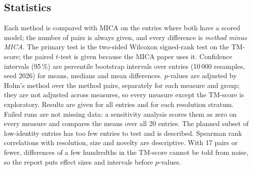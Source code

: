 \subsection{Statistics}\label{sec:stats}
Each method is compared with MICA on the entries where both have a scored model; the number of pairs is always given, and every difference is \emph{method minus MICA}. The primary test is the two-sided Wilcoxon signed-rank test on the TM-score; the paired $t$-test is given because the MICA paper uses it. Confidence intervals (95\,\%) are percentile bootstrap intervals over entries (10\,000 resamples, seed 2026) for means, medians and mean differences. $p$-values are adjusted by Holm's method over the \NFamilyWord{} method pairs, separately for each measure and group; they are not adjusted across measures, so every measure except the TM-score is exploratory. Results are given for all entries and for each resolution stratum. Failed runs are not missing data: a sensitivity analysis scores them as zero on every measure and compares the means over all 20 entries. The planned subset of low-identity entries has too few entries to test and is described. Spearman rank correlations with resolution, size and novelty are descriptive. With 17 pairs or fewer, differences of a few hundredths in the TM-score cannot be told from noise, so the report puts effect sizes and intervals before $p$-values.
